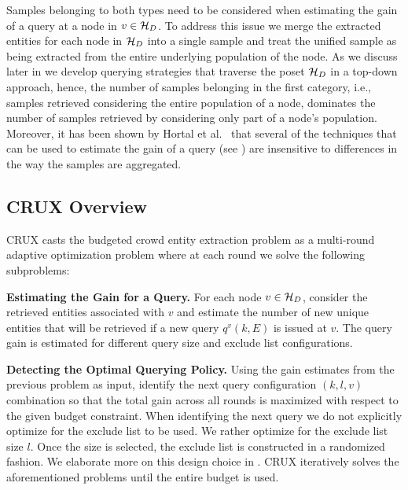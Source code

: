 Samples belonging to both types need to be considered when estimating the gain of a query at a node in $v \in \mathcal{H}_D$. To address this issue we merge the extracted entities for each node in $\mathcal{H}_D$ into a single sample and treat the unified sample as being extracted from the entire underlying population of the node. As we discuss later in  we develop querying strategies that traverse the poset $\mathcal{H}_D$ in a top-down approach, hence, the number of samples belonging in the first category, i.e., samples retrieved considering the entire population of a node, dominates the number of samples retrieved by considering only part of a node's population. Moreover, it has been shown by Hortal et al.~\cite{hortal2006evaluating} that several of the techniques that can be used to estimate the gain of a query (see ) are insensitive to differences in the way the samples are aggregated.
\fi
\subsection{CRUX Overview}
\label{sec:framework}
CRUX casts the budgeted crowd entity extraction problem as a multi-round adaptive optimization problem where at each round we solve the following subproblems: 
\squishlist 
\item \textbf{Estimating the Gain for a Query.} For each node $v \in \mathcal{H}_D$, consider the retrieved entities associated with $v$ and estimate the number of new unique entities that will be retrieved if a new query $q^v(k,E)$ is issued at $v$. The query gain is estimated for different query size and exclude list configurations.
\item \textbf{Detecting the Optimal Querying Policy.} Using the gain estimates from the previous problem as input, identify the next query configuration $(k,l,v)$ combination so that the total gain across all rounds is maximized with respect to the given budget constraint. When identifying the next query we do not explicitly optimize for the exclude list to be used. We rather optimize for the exclude list size $l$. Once the size is selected, the exclude list is constructed in a randomized fashion. We elaborate more on this design choice in .
\squishend
CRUX iteratively solves the aforementioned problems until the entire budget is used. 
%

